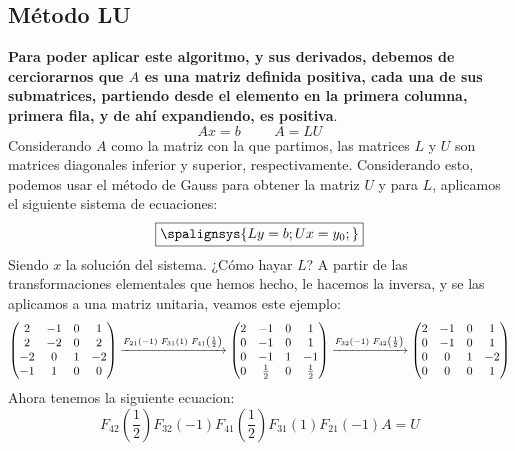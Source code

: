 \subsection{Método LU}
\noindent \textbf{Para poder aplicar este algoritmo, y sus derivados, debemos de cerciorarnos que \(A\) es una matriz definida positiva, cada una de sus submatrices, partiendo desde el elemento en la primera columna, primera fila, y de ahí expandiendo, es positiva}.
\[
        Ax = b \hspace{1cm} A = LU
\]
\noindent Considerando \(A\) como la matriz con la que partimos, las matrices \(L\) y \(U\) son matrices diagonales inferior y superior, respectivamente. Considerando esto, podemos usar el método de Gauss para obtener la matriz \(U\) y para \(L\), aplicamos el siguiente sistema de ecuaciones:
\[
        \boxed{
                \spalignsys{
                        Ly = b ;
                        Ux = y_0;
                }}
\]
\noindent Siendo \(x\) la solución del sistema. ¿Cómo hayar \(L\)? A partir de las transformaciones elementales que hemos hecho, le hacemos la inversa, y se las aplicamos a una matriz unitaria, veamos este ejemplo:
\[
        \begin{pmatrix}
                2  & -1 & 0 & 1  \\
                2  & -2 & 0 & 2  \\
                -2 & 0  & 1 & -2 \\
                -1 & 1  & 0 & 0
        \end{pmatrix}
        \xrightarrow[]{F_{21}(-1) \hspace{1mm} F_{31}(1) \hspace{1mm} F_{41}\left ( \frac{1}{2} \right )}
        \begin{pmatrix}
                2 & -1          & 0 & 1           \\
                0 & -1          & 0 & 1           \\
                0 & -1          & 1 & -1          \\
                0 & \frac{1}{2} & 0 & \frac{1}{2}
        \end{pmatrix}
        \xrightarrow[]{F_{32}(-1) \hspace{1mm} F_{42}\left ( \frac{1}{2} \right )}
        \begin{pmatrix}
                2 & -1 & 0 & 1  \\
                0 & -1 & 0 & 1  \\
                0 & 0  & 1 & -2 \\
                0 & 0  & 0 & 1
        \end{pmatrix}
\]
\noindent Ahora tenemos la siguiente ecuacion:
\[F_{42}\left ( \frac{1}{2} \right )F_{32}(-1)F_{41}\left ( \frac{1}{2} \right )F_{31}(1)F_{21}(-1)A = U\]

